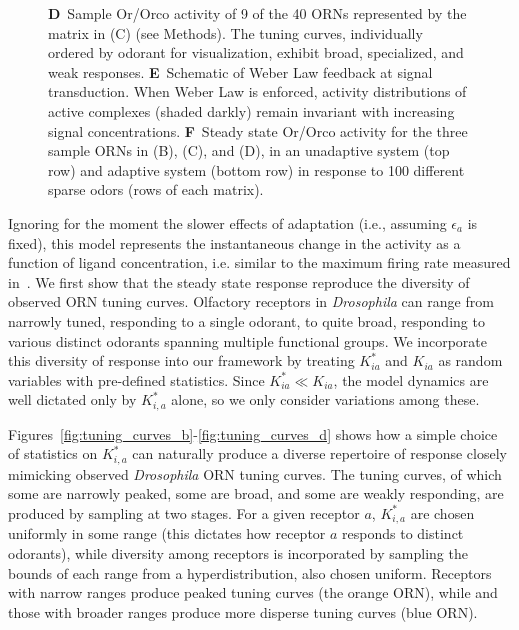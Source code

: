 \begin{figure}
{{		\textbf{D}~Sample Or/Orco activity of 9 of the 40 ORNs represented by the matrix in (C) (see Methods). The tuning curves, individually ordered by odorant for visualization, exhibit broad, specialized, and weak responses. 
		\textbf{E}~Schematic of Weber Law feedback at signal transduction. When Weber Law is enforced, activity distributions of active complexes (shaded darkly) remain invariant with increasing signal concentrations. 
		\textbf{F}~Steady state Or/Orco activity for the three sample ORNs in (B), (C), and (D), in an unadaptive system (top row) and adaptive system (bottom row) in response to 100 different sparse odors (rows of each matrix).
		}}
	\label{fig:tuning_curves}
\end{figure}

Ignoring for the moment the slower effects of adaptation (i.e., assuming $\epsilon_a$ is fixed), this model represents the instantaneous change in the activity as a function of ligand concentration, i.e. similar to the maximum firing rate measured in~\cite{hallem_carlson}. We first show that the steady state response reproduce the diversity of observed ORN tuning curves. Olfactory receptors in \textit{Drosophila} can range from narrowly tuned, responding to a single odorant, to quite broad, responding to various distinct odorants spanning multiple functional groups. We incorporate this diversity of response into our framework by treating $K^*_{ia}$ and $K_{ia}$ as random variables with pre-defined statistics. Since $K^*_{ia} \ll K_{ia}$, the model dynamics are well dictated only by $K^*_{i, a}$ alone, so we only consider variations among these. 

Figures~\ref{fig:tuning_curves_b}-\ref{fig:tuning_curves_d} shows how a simple choice of statistics on $K^*_{i, a}$ can naturally produce a diverse repertoire of response closely mimicking observed \textit{Drosophila} ORN tuning curves. The tuning curves, of which some are narrowly peaked, some are broad, and some are weakly responding, are produced by sampling at two stages. For a given receptor $a$, $K^*_{i,a}$ are chosen uniformly in some range (this dictates how receptor $a$ responds to distinct odorants), while diversity among receptors is incorporated by sampling the bounds of each range from a hyperdistribution, also chosen uniform. Receptors with narrow ranges produce peaked tuning curves (the orange ORN), while and those with broader ranges produce more disperse tuning curves (blue ORN). 

